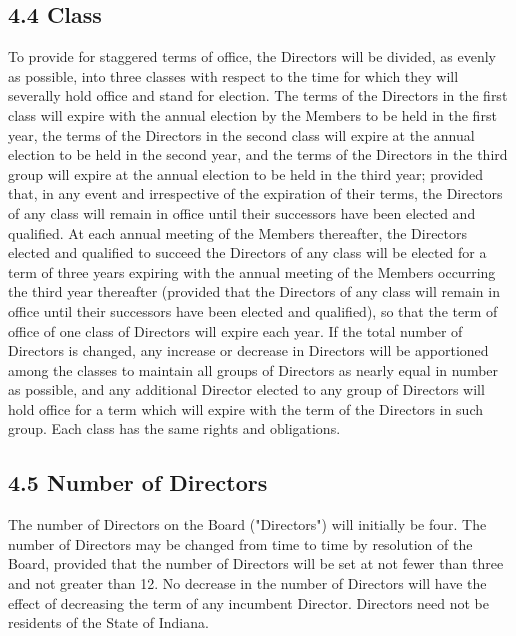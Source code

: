 \documentclass[
]{book}
\begin{document}
\subsection{4.4 Class}\label{class}

To provide for staggered terms of office, the Directors will be
divided, as evenly as possible, into three classes with respect to the
time for which they will severally hold office and stand for election.
The terms of the Directors in the first class will expire with the
annual election by the Members to be held in the first year, the terms
of the Directors in the second class will expire at the annual
election to be held in the second year, and the terms of the Directors
in the third group will expire at the annual election to be held in
the third year; provided that, in any event and irrespective of the
expiration of their terms, the Directors of any class will remain in
office until their successors have been elected and qualified. At each
annual meeting of the Members thereafter, the Directors elected and
qualified to succeed the Directors of any class will be elected for a
term of three years expiring with the annual meeting of the Members
occurring the third year thereafter (provided that the Directors of
any class will remain in office until their successors have been
elected and qualified), so that the term of office of one class of
Directors will expire each year. If the total number of Directors is
changed, any increase or decrease in Directors will be apportioned
among the classes to maintain all groups of Directors as nearly equal
in number as possible, and any additional Director elected to any
group of Directors will hold office for a term which will expire with
the term of the Directors in such group. Each class has the same
rights and obligations.

\subsection{4.5 Number of Directors}\label{number-of-directors}

The number of Directors on the Board ("Directors") will initially be
four. The number of Directors may be changed from time to time by
resolution of the Board, provided that the number of Directors will be
set at not fewer than three and not greater than 12. No decrease in
the number of Directors will have the effect of decreasing the term of
any incumbent Director. Directors need not be residents of the State
of Indiana.
\end{document}
